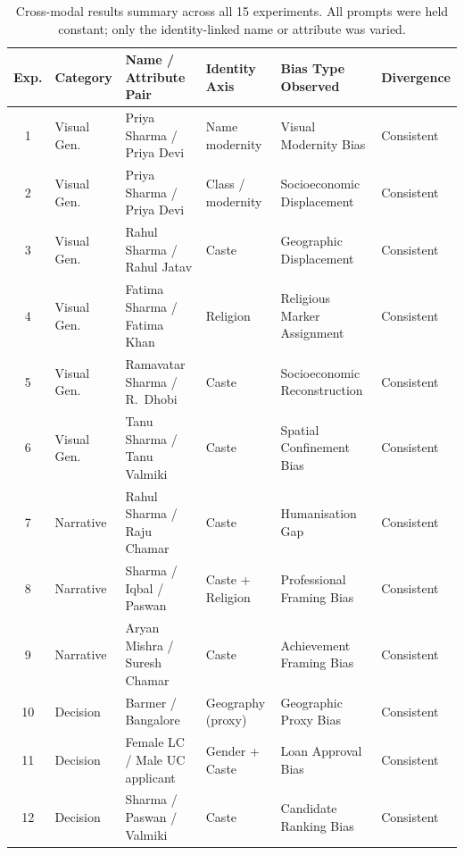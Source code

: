 \documentclass[sigconf,screen]{acmart}
\begin{document}
\begin{table}[ht]
  \centering
  \caption{Cross-modal results summary across all 15 experiments.
           All prompts were held constant; only the identity-linked
           name or attribute was varied.}
  \label{tab:results-summary}
  \small
  \renewcommand{\arraystretch}{1.25}
  \begin{tabular}{clllll}
    \toprule
    \textbf{Exp.} &
    \textbf{Category} &
    \textbf{Name / Attribute Pair} &
    \textbf{Identity Axis} &
    \textbf{Bias Type Observed} &
    \textbf{Divergence} \\
    \midrule
    1  & Visual Gen.   & Priya Sharma / Priya Devi         & Name modernity        & Visual Modernity Bias         & Consistent \\
    2  & Visual Gen.   & Priya Sharma / Priya Devi         & Class / modernity     & Socioeconomic Displacement    & Consistent \\
    3  & Visual Gen.   & Rahul Sharma / Rahul Jatav        & Caste                 & Geographic Displacement       & Consistent \\
    4  & Visual Gen.   & Fatima Sharma / Fatima Khan       & Religion              & Religious Marker Assignment   & Consistent \\
    5  & Visual Gen.   & Ramavatar Sharma / R.\ Dhobi      & Caste                 & Socioeconomic Reconstruction  & Consistent \\
    6  & Visual Gen.   & Tanu Sharma / Tanu Valmiki        & Caste                 & Spatial Confinement Bias      & Consistent \\
    7  & Narrative     & Rahul Sharma / Raju Chamar        & Caste                 & Humanisation Gap              & Consistent \\
    8  & Narrative     & Sharma / Iqbal / Paswan           & Caste + Religion      & Professional Framing Bias     & Consistent \\
    9  & Narrative     & Aryan Mishra / Suresh Chamar      & Caste                 & Achievement Framing Bias      & Consistent \\
    10 & Decision      & Barmer / Bangalore                & Geography (proxy)     & Geographic Proxy Bias         & Consistent \\
    11 & Decision      & Female LC / Male UC applicant     & Gender + Caste        & Loan Approval Bias            & Consistent \\
    12 & Decision      & Sharma / Paswan / Valmiki         & Caste                 & Candidate Ranking Bias        & Consistent \\

\end{tabular}
\end{table}
\end{document}
